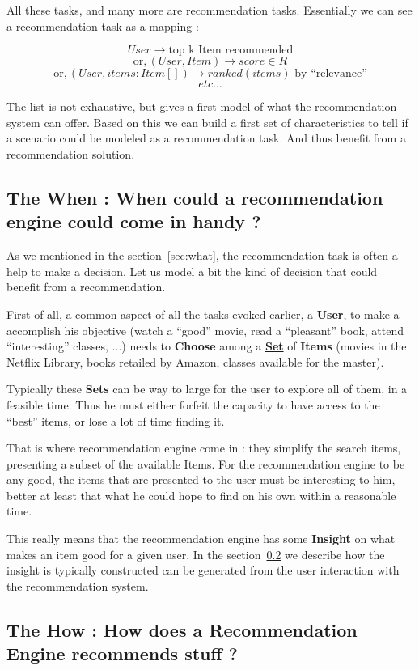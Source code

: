 \documentclass{article}
\begin{document}
All these tasks, and many more are recommendation tasks. Essentially we can see a recommendation task as a mapping :

$$User \rightarrow \text{top k Item recommended}$$
$$\text{or}, (User, Item) \rightarrow score \in R$$
$$\text{or}, (User, items : Item[]) \rightarrow ranked(items) \text{ by ``relevance''}$$
$$ etc ...$$

The list is not exhaustive, but gives a first model of what the recommendation system can offer.
Based on this we can build a first set of characteristics to tell if a scenario could be modeled as a recommendation task. And thus benefit from a recommendation solution.

\subsection{The When : When could a recommendation engine could come in handy ?}

As we mentioned in the section~\ref{sec:what}, the recommendation task is often a help to make a decision. Let us model a bit the kind of decision that could benefit from a recommendation.

First of all, a common aspect of all the tasks evoked earlier, a \textbf{User}, to make a accomplish his objective (watch a ``good'' movie, read a ``pleasant'' book, attend ``interesting'' classes, ...) needs to \textbf{Choose} among a \underline{\textbf{Set}} of \textbf{Items} (movies in the Netflix Library, books retailed by Amazon, classes available for the master).

Typically these \textbf{Sets} can be way to large for the user to explore all of them, in a feasible time. Thus he must either forfeit the capacity to have access to the ``best'' items, or lose a lot of time finding it.

That is where recommendation engine come in : they simplify the search items, presenting a subset of the available Items. For the recommendation engine to be any good, the items that are presented to the user must be interesting to him, better at least that what he could hope to find on his own within a reasonable time. 

This really means that the recommendation engine has some \textbf{Insight} on what makes an item good for a given user. In the section~\ref{sec:how} we describe how the insight is typically constructed can be generated from the user interaction with the recommendation system. 


\subsection{The How : How does a Recommendation Engine recommends stuff ?}
\label{sec:how}
\end{document}
